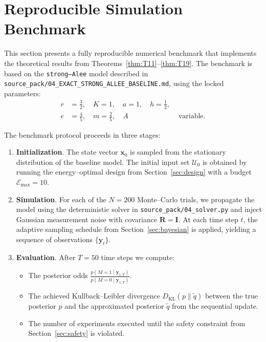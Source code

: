 \section{Reproducible Simulation Benchmark}
\label{sec:benchmark}

This section presents a fully reproducible numerical benchmark that implements the theoretical results from Theorems~\ref{thm:T11}--\ref{thm:T19}.  The benchmark is based on the \texttt{strong--Alee} model described in \texttt{source\_pack/04\_EXACT\_STRONG\_ALLEE\_BASELINE.md}, using the locked parameters:
\begin{align*}
    r &= \tfrac{3}{2},\quad K = 1,\quad a = 1,\quad h = \tfrac{1}{2},\\
    e &= \tfrac{4}{5},\quad m = \tfrac{2}{5},\quad A &\text{ variable.}
\end{align*}

The benchmark protocol proceeds in three stages:
\begin{enumerate}
    \item \textbf{Initialization}.  The state vector $\mathbf{x}_0$ is sampled from the stationary distribution of the baseline model.  The initial input set $\mathcal{U}_0$ is obtained by running the energy–optimal design from Section~\ref{sec:design} with a budget $\mathcal{E}_{\max}=10$.
    \item \textbf{Simulation}.  For each of the $N=200$ Monte--Carlo trials, we propagate the model using the deterministic solver in \texttt{source\_pack/04\_solver.py} and inject Gaussian measurement noise with covariance $\mathbf{R}=\mathbf{I}$.  At each time step $t$, the adaptive sampling schedule from Section~\ref{sec:bayesian} is applied, yielding a sequence of observations $\{\mathbf{y}_t\}$.
    \item \textbf{Evaluation}.  After $T=50$ time steps we compute:
    \begin{itemize}
        \item The posterior odds $\frac{p(M=1\mid \mathbf{y}_{1:T})}{p(M=0\mid \mathbf{y}_{1:T})}$.
        \item The achieved Kullback--Leibler divergence $D_{\mathrm{KL}}(p\|\tilde{q})$ between the true posterior $p$ and the approximated posterior $\tilde{q}$ from the sequential update.
        \item The number of experiments executed until the safety constraint from Section~\ref{sec:safety} is violated.
    \end{itemize}
\end{enumerate}

